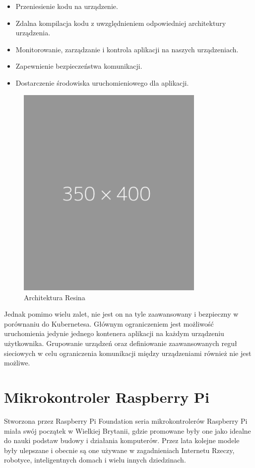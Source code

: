 \documentclass[12pt]{report}
\let\Oldsection\section
\renewcommand{\section}{\FloatBarrier\Oldsection}
\begin{document}
{\begin{itemize}
\item{Przeniesienie kodu na urządzenie.}
\item{Zdalna kompilacja kodu z uwzględnieniem odpowiedniej architektury urządzenia.}
\item{Monitorowanie, zarządzanie i kontrola aplikacji na naszych urządzeniach.}
\item{Zapewnienie bezpieczeństwa komunikacji.}
\item{Dostarczenie środowiska uruchomieniowego dla aplikacji.}
\end{itemize}

\begin{figure}[h]
	\centering
	\includegraphics[width=0.81\textwidth]{images/placeholder.png}
	\caption{Architektura Resina}
\end{figure}

Jednak pomimo wielu zalet, nie jest on na tyle zaawansowany i bezpieczny w porównaniu do Kubernetesa. Głównym ograniczeniem jest możliwość uruchomienia jedynie jednego kontenera aplikacji na każdym urządzeniu użytkownika. Grupowanie urządzeń oraz definiowanie zaawansowanych reguł sieciowych w celu ograniczenia komunikacji między urządzeniami również nie jest możliwe.

\section{Mikrokontroler Raspberry Pi}
Stworzona przez Raspberry Pi Foundation seria mikrokontrolerów Raspberry Pi miała swój początek w Wielkiej Brytanii, gdzie promowane były one jako idealne do nauki podstaw budowy i działania komputerów. Przez lata kolejne modele były ulepszane i obecnie są one używane w zagadnieniach Internetu Rzeczy, robotyce, inteligentnych domach i wielu innych dziedzinach.

}
\end{document}
